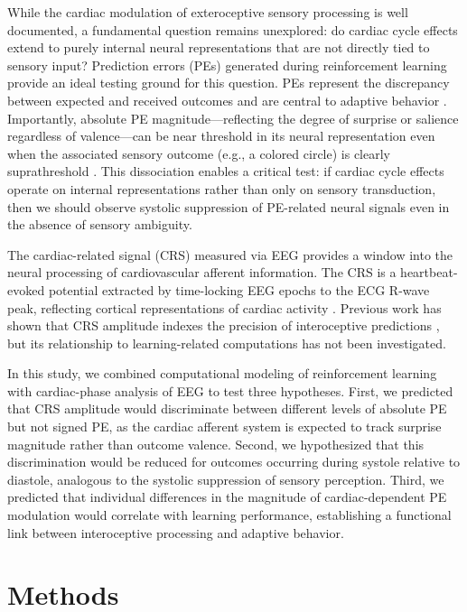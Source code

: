 \documentclass[12pt]{article}
\begin{document}
While the cardiac modulation of exteroceptive sensory processing is well documented, a fundamental question remains unexplored: do cardiac cycle effects extend to purely internal neural representations that are not directly tied to sensory input? Prediction errors (PEs) generated during reinforcement learning provide an ideal testing ground for this question. PEs represent the discrepancy between expected and received outcomes and are central to adaptive behavior \citep{rescorla1972theory, sutton1998reinforcement}. Importantly, absolute PE magnitude---reflecting the degree of surprise or salience regardless of valence---can be near threshold in its neural representation even when the associated sensory outcome (e.g., a colored circle) is clearly suprathreshold \citep{schultz1997neural, behrens2007learning}. This dissociation enables a critical test: if cardiac cycle effects operate on internal representations rather than only on sensory transduction, then we should observe systolic suppression of PE-related neural signals even in the absence of sensory ambiguity.

The cardiac-related signal (CRS) measured via EEG provides a window into the neural processing of cardiovascular afferent information. The CRS is a heartbeat-evoked potential extracted by time-locking EEG epochs to the ECG R-wave peak, reflecting cortical representations of cardiac activity \citep{schandry1986heartbeat, pollatos2007reduced}. Previous work has shown that CRS amplitude indexes the precision of interoceptive predictions \citep{ainley2016heartfelt, marshall2018heartbeat}, but its relationship to learning-related computations has not been investigated.

In this study, we combined computational modeling of reinforcement learning with cardiac-phase analysis of EEG to test three hypotheses. First, we predicted that CRS amplitude would discriminate between different levels of absolute PE but not signed PE, as the cardiac afferent system is expected to track surprise magnitude rather than outcome valence. Second, we hypothesized that this discrimination would be reduced for outcomes occurring during systole relative to diastole, analogous to the systolic suppression of sensory perception. Third, we predicted that individual differences in the magnitude of cardiac-dependent PE modulation would correlate with learning performance, establishing a functional link between interoceptive processing and adaptive behavior.

\section{Methods}
\end{document}
